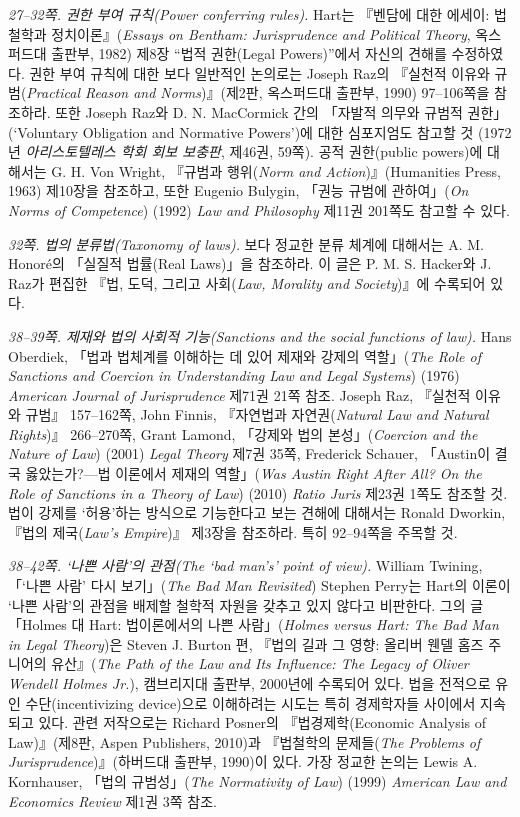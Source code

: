 \documentclass[12pt, oneside]{book}  %
\begin{document}
\emph{27--32쪽. 권한 부여 규칙(Power conferring rules).} Hart는 『벤담에
대한 에세이: 법철학과 정치이론』(\emph{Essays on Bentham: Jurisprudence
and Political Theory}, 옥스퍼드대 출판부, 1982) 제8장 ``법적 권한(Legal
Powers)''에서 자신의 견해를 수정하였다. 권한 부여 규칙에 대한 보다
일반적인 논의로는 Joseph Raz의 『실천적 이유와 규범(\emph{Practical
Reason and Norms})』(제2판, 옥스퍼드대 출판부, 1990) 97--106쪽을
참조하라. 또한 Joseph Raz와 D. N. MacCormick 간의 「자발적 의무와 규범적
권한」(`Voluntary Obligation and Normative Powers')에 대한 심포지엄도
참고할 것 (1972년 \emph{아리스토텔레스 학회 회보 보충판}, 제46권, 59쪽).
공적 권한(public powers)에 대해서는 G. H. Von Wright, 『규범과
행위(\emph{Norm and Action})』(Humanities Press, 1963) 제10장을
참조하고, 또한 Eugenio Bulygin, 「권능 규범에 관하여」(\emph{On Norms of
Competence}) (1992) \emph{Law and Philosophy} 제11권 201쪽도 참고할 수
있다.

\emph{32쪽. 법의 분류법(Taxonomy of laws).} 보다 정교한 분류 체계에
대해서는 A. M. Honoré의 「실질적 법률(Real Laws)」을 참조하라. 이 글은
P. M. S. Hacker와 J. Raz가 편집한 『법, 도덕, 그리고 사회(\emph{Law,
Morality and Society})』에 수록되어 있다.

\emph{38--39쪽. 제재와 법의 사회적 기능(Sanctions and the social
functions of law).} Hans Oberdiek, 「법과 법체계를 이해하는 데 있어
제재와 강제의 역할」(\emph{The Role of Sanctions and Coercion in
Understanding Law and Legal Systems}) (1976) \emph{American Journal of
Jurisprudence} 제71권 21쪽 참조. Joseph Raz, 『실천적 이유와 규범』
157--162쪽, John Finnis, 『자연법과 자연권(\emph{Natural Law and Natural
Rights})』 266--270쪽, Grant Lamond, 「강제와 법의 본성」(\emph{Coercion
and the Nature of Law}) (2001) \emph{Legal Theory} 제7권 35쪽, Frederick
Schauer, 「Austin이 결국 옳았는가?---법 이론에서 제재의 역할」(\emph{Was
Austin Right After All? On the Role of Sanctions in a Theory of Law})
(2010) \emph{Ratio Juris} 제23권 1쪽도 참조할 것. 법이 강제를 `허용'하는
방식으로 기능한다고 보는 견해에 대해서는 Ronald Dworkin, 『법의
제국(\emph{Law's Empire})』 제3장을 참조하라. 특히 92--94쪽을 주목할 것.

\emph{38--42쪽. `나쁜 사람'의 관점(The `bad man's' point of view).}
William Twining, 「`나쁜 사람' 다시 보기」(\emph{The Bad Man Revisited})
Stephen Perry는 Hart의 이론이 `나쁜 사람'의 관점을 배제할 철학적 자원을
갖추고 있지 않다고 비판한다. 그의 글 「Holmes 대 Hart: 법이론에서의 나쁜
사람」(\emph{Holmes versus Hart: The Bad Man in Legal Theory})은 Steven
J. Burton 편, 『법의 길과 그 영향: 올리버 웬델 홈즈 주니어의
유산』(\emph{The Path of the Law and Its Influence: The Legacy of Oliver
Wendell Holmes Jr.}), 캠브리지대 출판부, 2000년에 수록되어 있다. 법을
전적으로 유인 수단(incentivizing device)으로 이해하려는 시도는 특히
경제학자들 사이에서 지속되고 있다. 관련 저작으로는 Richard Posner의
『법경제학(Economic Analysis of Law)』(제8판, Aspen Publishers, 2010)과
『법철학의 문제들(\emph{The Problems of Jurisprudence})』(하버드대
출판부, 1990)이 있다. 가장 정교한 논의는 Lewis A. Kornhauser, 「법의
규범성」(\emph{The Normativity of Law}) (1999) \emph{American Law and
Economics Review} 제1권 3쪽 참조.
\end{document}
